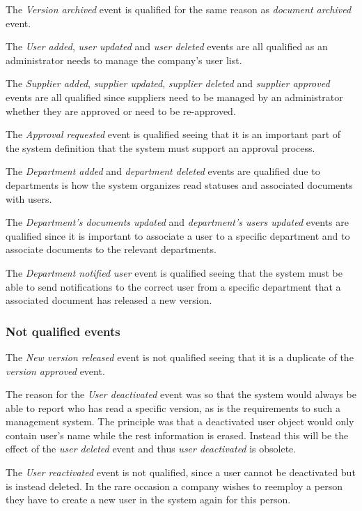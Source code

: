 The \textit{Version archived} event is qualified for the same reason as \textit{document archived} event.

The \textit{User added}, \textit{user updated} and \textit{user deleted} events are all qualified as an administrator needs to manage the company's user list.

The \textit{Supplier added}, \textit{supplier updated},  \textit{supplier deleted} and \textit{supplier approved} events are all qualified since suppliers need to be managed by an administrator whether they are approved or need to be re-approved.

The \textit{Approval requested} event is qualified seeing that it is an important part of the system definition that the system must support an approval process.

The \textit{Department added} and \textit{department deleted} events are qualified due to departments is how the system organizes read statuses and associated documents with users.

The \textit{Department's documents updated} and \textit{department's users updated} events are qualified since it is important to associate a user to a specific department and to associate documents to the relevant departments.

The \textit{Department notified user} event is qualified seeing that the system must be able to send notifications to the correct user from a specific department that a associated document has released a new version.

\subsubsection*{Not qualified events}

The \textit{New version released} event is not qualified seeing that it is a duplicate of the \textit{version approved} event.

The reason for the \textit{User deactivated} event was so that the system would always be able to report who has read a specific version, as is the requirements to such a management system.
The principle was that a deactivated user object would only contain user's name while the rest information is erased.
Instead this will be the effect of the \textit{user deleted} event and thus \textit{user deactivated} is obsolete.

The \textit{User reactivated} event is not qualified, since a user cannot be deactivated but is instead deleted. In the rare occasion a company wishes to reemploy a person they have to create a new user in the system again for this person.

